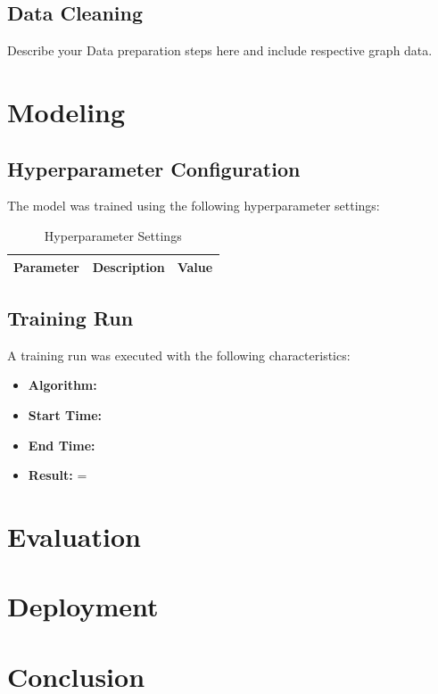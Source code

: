 \documentclass[sigconf]{acmart}
\begin{document}
\subsection{Data Cleaning}
Describe your Data preparation steps here and include respective graph data.


\section{Modeling}

\subsection{Hyperparameter Configuration}
The model was trained using the following hyperparameter settings:

\begin{table}[h]
  \caption{Hyperparameter Settings}
  \label{tab:hyperparams}
  \begin{tabular}{lp{0.4\linewidth}l}
    \toprule
    \textbf{Parameter} & \textbf{Description} & \textbf{Value} \\
    \midrule
    
    \bottomrule
  \end{tabular}
\end{table}

\subsection{Training Run}
A training run was executed with the following characteristics:
\begin{itemize}
    \item \textbf{Algorithm:} 
    \item \textbf{Start Time:} 
    \item \textbf{End Time:} 
    \item \textbf{Result:}  = 
\end{itemize}

\section{Evaluation}

\section{Deployment}

\section{Conclusion}
\end{document}
